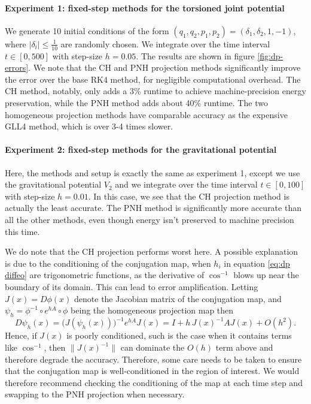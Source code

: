 \documentclass[final,3p,times]{elsarticle}
\begin{document}
\paragraph{Experiment 1: fixed-step methods for the torsioned joint potential} 
We generate 10 initial conditions of the form $(q_1, q_2, p_1, p_2) = (\delta_1, \delta_2, 1, -1)$, where $|\delta_i|\le \tfrac{1}{10}$ are randomly chosen. We integrate over the time interval $t\in[0,500]$ with step-size $h=0.05$. The results are shown in figure \ref{fig:dp-errors}. 
We note that the CH and PNH projection methods significantly improve the error over the base RK4 method, for negligible computational overhead. The CH method, notably, only adds a 3\% runtime to achieve machine-precision energy preservation, while the PNH method adds about 40\% runtime. The two homogeneous projection methods have comparable accuracy as the expensive GLL4 method, which is over 3-4 times slower.

\paragraph{Experiment 2: fixed-step methods for the gravitational potential} 
Here, the methods and setup is exactly the same as experiment 1, except we use the gravitational potential $V_2$ and we integrate over the time interval $t\in[0,100]$ with step-size $h=0.01$. In this case, we see that the CH projection method is actually the least accurate. The PNH method is significantly more accurate than all the other methods, even though energy isn't preserved to machine precision this time. 

We do note that the CH projection performs worst here. A possible explanation is due to the conditioning of the conjugation map, when $h_i$ in equation \eqref{eq:dp diffeo} are trigonometric functions, as the derivative of $\cos^{-1}$ blows up near the boundary of its domain. This can lead to error amplification. Letting $J(x) = D\phi(x)$ denote the Jacobian matrix of the conjugation map, and $\psi_h = \phi^{-1} \circ e^{hA} \circ \phi$ being the homogeneous projection map then 
$$
D\psi_h(x) = \big(J(\psi_h(x))\big)^{-1} e^{hA} J(x) 
  = I + h\, J(x)^{-1} A J(x) + O(h^2).
$$
Hence, if $J(x)$ is poorly conditioned, such is the case when it contains terms like $\cos^{-1}$, then $\|J(x)^{-1}\|$ can dominate the $O(h)$ term above and therefore degrade the accuracy. Therefore, some care needs to be taken to ensure that the conjugation map is well-conditioned in the region of interest. We would therefore recommend checking the conditioning of the map at each time step and swapping to the PNH projection when necessary.
\end{document}
